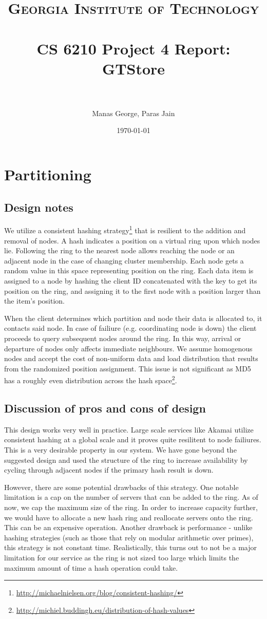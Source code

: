 \documentclass[paper=a4,fontsize=11pt]{report} %
\title{	
\normalfont \normalsize 
\textsc{Georgia Institute of Technology} \\ [25pt] %
\horrule{0.5pt} \\[0.4cm] %
\huge CS 6210 Project 4 Report: GTStore \\ %
\horrule{2pt} \\[0.5cm] %
}
\author{Manas George, Paras Jain} %
\date{\normalsize\today} %
\numberwithin{equation}{section} %
\numberwithin{figure}{section} %
\numberwithin{table}{section} %
\begin{document}
\maketitle %

\section{Partitioning}
\subsection{Design notes}
We utilize a consistent hashing strategy\footnote{\url{http://michaelnielsen.org/blog/consistent-hashing/}} that is resilient to the addition and removal of nodes. A hash indicates a position on a virtual ring upon which nodes lie. Following the ring to the nearest node allows reaching the node or an adjacent node in the case of changing cluster membership. Each node gets a random value in this space representing position on the ring. Each data item is assigned to a node by hashing the client ID concatenated with the key to get its position on the ring, and assigning it to the first node with a position larger than the item's position.

When the client determines which partition and node their data is allocated to, it contacts said node. In case of failiure (e.g. coordinating node is down) the client proceeds to query subsequent nodes around the ring. In this way, arrival or departure of nodes only affects immediate neighbours. We assume homogenous nodes and accept the cost of non-uniform data and load distribution that results from the randomized position assignment. This issue is not significant as MD5 has a roughly even distribution across the hash space\footnote{\url{http://michiel.buddingh.eu/distribution-of-hash-values}}.

\subsection{Discussion of pros and cons of design}
This design works very well in practice. Large scale services like Akamai utilize consistent hashing at a global scale and it proves quite resilitent to node failiures. This is a very desirable property in our system. We have gone beyond the suggested design and used the structure of the ring to increase availability by cycling through adjacent nodes if the primary hash result is down.  

However, there are some potential drawbacks of this strategy. One notable limitation is a cap on the number of servers that can be added to the ring. As of now, we cap the maximum size of the ring. In order to increase capacity further, we would have to allocate a new hash ring and reallocate servers onto the ring. This can be an expensive operation. Another drawback is performance - unlike hashing strategies (such as those that rely on modular arithmetic over primes), this strategy is not constant time. Realistically, this turns out to not be a major limitation for our service as the ring is not sized too large which limits the maximum amount of time a hash operation could take.
\end{document}
